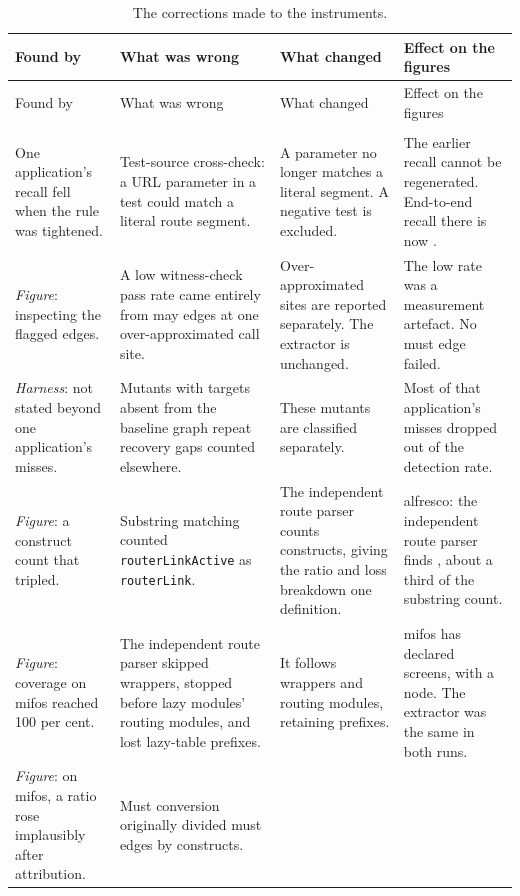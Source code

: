 \begingroup\footnotesize\setlength{\tabcolsep}{2.5pt}
\begin{xltabular}{\textwidth}{@{}YYYY@{}}
\caption{The corrections made to the instruments.}
\label{tab:repairs}\\
\toprule
Found by & What was wrong & What changed & Effect on the figures \\
\midrule
\endfirsthead
\toprule
Found by & What was wrong & What changed & Effect on the figures \\
\midrule
\endhead
\bottomrule
\endfoot
{} \\
One application's recall fell when the rule was tightened.
  & Test-source cross-check: a URL parameter in a test could match a literal route segment.
  & A parameter no longer matches a literal segment. A negative test is excluded.
  & The earlier recall cannot be regenerated. End-to-end recall there is now \EtoERateAlfresco{}. \\
\emph{Figure}: inspecting the flagged edges.
  & A low witness-check pass rate came entirely from may edges at one over-approximated call site.
  & Over-approximated sites are reported separately. The extractor is unchanged.
  & The low rate was a measurement artefact. No must edge failed. \\
\emph{Harness}: not stated beyond one application's misses.
  & Mutants with targets absent from the baseline graph repeat recovery gaps counted elsewhere.
  & These mutants are classified separately.
  & Most of that application's misses dropped out of the detection rate. \\
\emph{Figure}: a construct count that tripled.
  & Substring matching counted \texttt{routerLinkActive} as \texttt{routerLink}.
  & The independent route parser counts constructs, giving the ratio and loss breakdown one definition.
  & alfresco: the independent route parser finds \ConstructsAlfresco{}, about a third of the substring count. \\
\emph{Figure}: coverage on mifos reached 100 per cent.
  & The independent route parser skipped wrappers, stopped before lazy modules' routing modules, and lost lazy-table prefixes.
  & It follows wrappers and routing modules, retaining prefixes.
  & mifos has \RoundTwoEarlierOracleMifosDeclared{} declared screens, \NodeAuditMatchedMifos{} with a node. The extractor was the same in both runs. \\
\emph{Figure}: on mifos, a ratio rose implausibly after attribution.
  & Must conversion originally divided must edges by constructs.

\end{xltabular}
